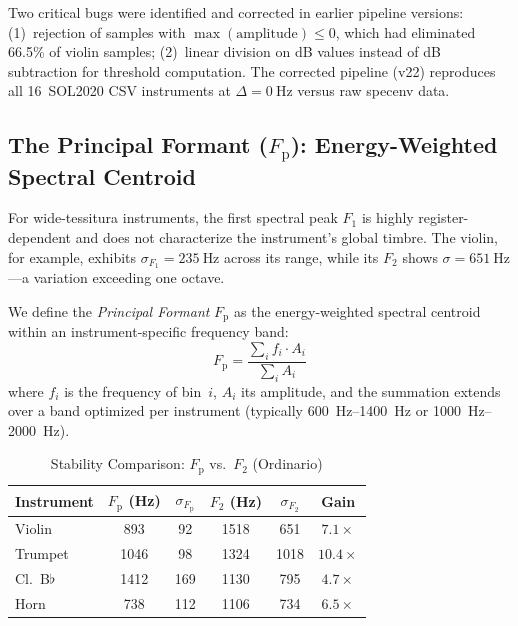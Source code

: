 \documentclass[journal]{IEEEtran}
\newcommand{\Fp}{F_\mathrm{p}}
\newcommand{\Fn}[1]{F_{#1}}
\begin{document}
Two critical bugs were identified and corrected in earlier pipeline versions: (1)~rejection of samples with $\max(\mathrm{amplitude}) \leq 0$, which had eliminated 66.5\% of violin samples; (2)~linear division on dB values instead of dB subtraction for threshold computation. The corrected pipeline (v22) reproduces all 16~SOL2020 CSV instruments at $\Delta = \SI{0}{\hertz}$ versus raw specenv data.

\subsection{The Principal Formant ($\Fp$): Energy-Weighted Spectral Centroid}
\label{sec:fp}

For wide-tessitura instruments, the first spectral peak $\Fn{1}$ is highly register-dependent and does not characterize the instrument's global timbre. The violin, for example, exhibits $\sigma_{\Fn{1}} = \SI{235}{\hertz}$ across its range, while its $\Fn{2}$ shows $\sigma = \SI{651}{\hertz}$---a variation exceeding one octave.

We define the \emph{Principal Formant} $\Fp$ as the energy-weighted spectral centroid within an instrument-specific frequency band:
\begin{equation}
\Fp = \frac{\sum_{i} f_i \cdot A_i}{\sum_{i} A_i}
\label{eq:fp}
\end{equation}
where $f_i$ is the frequency of bin~$i$, $A_i$ its amplitude, and the summation extends over a band optimized per instrument (typically \SIrange{600}{1400}{\hertz} or \SIrange{1000}{2000}{\hertz}).

\begin{table}[!t]
\centering
\caption{Stability Comparison: $\Fp$ vs.\ $\Fn{2}$ (Ordinario)}
\label{tab:fp_stability}
\begin{tabular}{@{}lS[table-format=4.0]S[table-format=3.0]S[table-format=4.0]S[table-format=4.0]c@{}}
\toprule
Instrument & {$\Fp$ (Hz)} & {$\sigma_{\Fp}$} & {$\Fn{2}$ (Hz)} & {$\sigma_{\Fn{2}}$} & {Gain} \\
\midrule
Violin     & 893  & 92  & 1518 & 651  & $7.1\times$ \\
Trumpet    & 1046 & 98  & 1324 & 1018 & $10.4\times$ \\
Cl.\ B$\flat$ & 1412 & 169 & 1130 & 795  & $4.7\times$ \\
Horn       & 738  & 112 & 1106 & 734  & $6.5\times$ \\
\bottomrule
\end{tabular}
\end{table}
\end{document}
